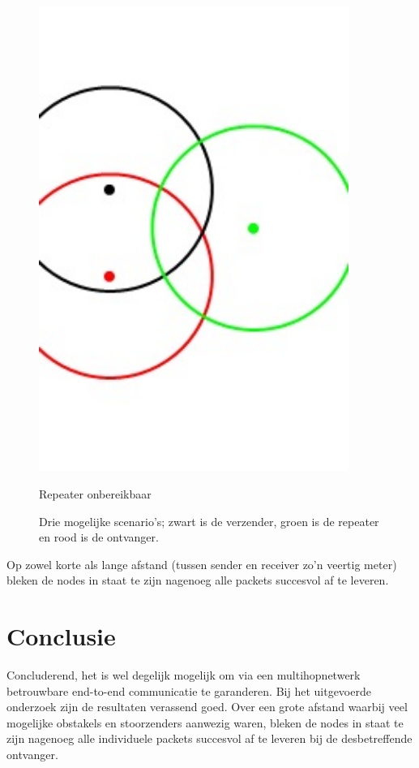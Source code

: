 \documentclass[a4paper,10pt]{article}
\begin{document}
\begin{figure}[ht!]
\begin{minipage}{\textwidth}
\begin{minipage}{0.3\textwidth}
            \includegraphics[width=0.9\textwidth]{drie.jpg}
            \caption*{Repeater onbereikbaar}
        \end{minipage}
	\caption{Drie mogelijke scenario's; zwart is de verzender, groen is de repeater en rood is de ontvanger.}
    \end{minipage}
\end{figure}

Op zowel korte als lange afstand (tussen sender en receiver zo'n veertig meter) bleken de nodes in staat te zijn nagenoeg alle packets succesvol af te leveren.

\section{Conclusie}
Concluderend, het is wel degelijk mogelijk om via een multihopnetwerk betrouwbare end-to-end communicatie te garanderen. Bij het uitgevoerde onderzoek zijn de resultaten verassend goed. Over een grote afstand waarbij veel mogelijke obstakels en stoorzenders aanwezig waren, bleken de nodes in staat te zijn nagenoeg alle individuele packets succesvol af te leveren bij de desbetreffende ontvanger.
\end{document}
